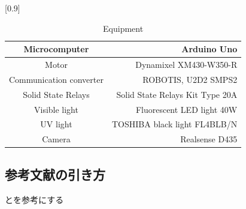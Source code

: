 \begin{table}[tb]
  \begin{center}
    \caption{{Equipment}\label{Hardware}}
    \scalebox{0.7}[0.9]{
      \begin{tabular}{|c|r|} \hline
        Microcomputer & Arduino Uno \\ \hline
        Motor & Dynamixel XM430-W350-R \\ \hline
        Communication converter & ROBOTIS, U2D2 SMPS2 \\ \hline
        Solid State Relays & Solid State Relays Kit Type 20A \\ \hline
        Visible light & Fluorescent LED light 40W \\ \hline
        UV light & TOSHIBA black light FL4BLB/N \\ \hline
        Camera & Realsense D435 \\ \hline
      \end{tabular}
    }
  \end{center}
\end{table}

\subsection{参考文献の引き方}
\cite{1}と\cite{2}を参考にする